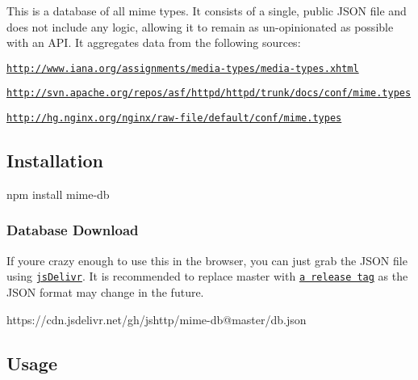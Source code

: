 \href{https://npmjs.org/package/mime-db}{\tt } \href{https://npmjs.org/package/mime-db}{\tt } \href{https://nodejs.org/en/download}{\tt } \href{https://travis-ci.org/jshttp/mime-db}{\tt } \href{https://coveralls.io/r/jshttp/mime-db?branch=master}{\tt }

This is a database of all mime types. It consists of a single, public J\+S\+ON file and does not include any logic, allowing it to remain as un-\/opinionated as possible with an A\+PI. It aggregates data from the following sources\+:


\begin{DoxyItemize}
\item \href{http://www.iana.org/assignments/media-types/media-types.xhtml}{\tt http\+://www.\+iana.\+org/assignments/media-\/types/media-\/types.\+xhtml}
\item \href{http://svn.apache.org/repos/asf/httpd/httpd/trunk/docs/conf/mime.types}{\tt http\+://svn.\+apache.\+org/repos/asf/httpd/httpd/trunk/docs/conf/mime.\+types}
\item \href{http://hg.nginx.org/nginx/raw-file/default/conf/mime.types}{\tt http\+://hg.\+nginx.\+org/nginx/raw-\/file/default/conf/mime.\+types}
\end{DoxyItemize}

\subsection*{Installation}


\begin{DoxyCode}
npm install mime-db
\end{DoxyCode}


\subsubsection*{Database Download}

If you\textquotesingle{}re crazy enough to use this in the browser, you can just grab the J\+S\+ON file using \href{https://www.jsdelivr.com/}{\tt js\+Delivr}. It is recommended to replace {\ttfamily master} with \href{https://github.com/jshttp/mime-db/tags}{\tt a release tag} as the J\+S\+ON format may change in the future.


\begin{DoxyCode}
https://cdn.jsdelivr.net/gh/jshttp/mime-db@master/db.json
\end{DoxyCode}


\subsection*{Usage}


